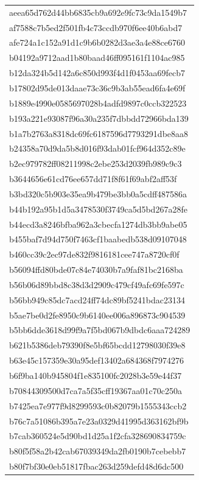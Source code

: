 \begin{tabular}{l}
aeea65d762d44bb6835cb9a692e9fc73c9da1549b7 \\
af7588c7b5ed2f501fb4c73ccdb970f6ee40b6abd7 \\
afe724a1c152a91d1c9b6b0282d3ae3a4e88ce6760 \\
b04192a9712aad1b80baad46ff095161f1104ac985 \\
b12da324b5d142a6c850d993f4d1f0453aa69fecb7 \\
b17802d95de013daae73c36c9b3ab55ead6fa4e69f \\
b1889e4990e0585697028b4adfd9897c0ccb322523 \\
b193a221e93087f96a30a235f7dbbdd72966bda139 \\
b1a7b2763a8318dc69fc6187596d7793291dbe8aa8 \\
b24358a70d9da5b8d016f93dab01fcf964d352c89e \\
b2ec979782ff08211998c2ebe253d2039fb989c9c3 \\
b3644656e61cd76ee657dd71f8f61f69abf2aff53f \\
b3bd320c5b903e35ea9b479be3bb0a5cdff487586a \\
b44b192a95b1d5a3478530f3749ca5d5bd267a28fe \\
b44ecd3a8246bfba962a3cbecfa1274db3bb9abe05 \\
b455baf7d94d750f7463cf1baabedb538d09107048 \\
b460cc39c2ec97de832f9816181cee747a8720cf0f \\
b56094ffd80bde07c84e74030b7a9faf81bc2168ba \\
b56b06d89bbd8c38d3d2909c479cf49afc69fe597c \\
b56bb949c85dc7acd24ff74dc89bf5241bdac23134 \\
b5ae7be0d2fe8950c9b6140ee006a896873c904539 \\
b5bb6dde3618d99f9a7f5bd067b9dbdc6aaa724289 \\
b621b5386deb79390f8e5bf65bcdd12798030f39e8 \\
b63e45c157359e30a95def13402a684368f7974276 \\
b6f9ba140b945804f1e835100fc2028b3e59e44f37 \\
b70844309500d7ca7a5f35cff19367aa01c70c250a \\
b7425ea7e977f9d8299593c0b82079b1555343ccb2 \\
b76c7a51086b395a7e23a0329d41995d363162bf9b \\
b7cab360524e5d90bd1d25a1f2cfa328690834759c \\
b80f5f58a2b42cab67039349da2fb0190b7cebebb7 \\
b80f7bf30e0eb51817fbac263d259defd48d6dc500 \\

\end{tabular}
